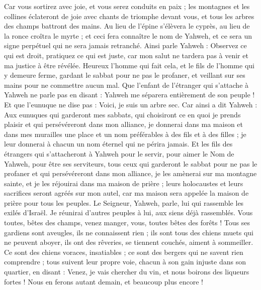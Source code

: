 \begin{multicols}{2}
Car vous sortirez avec joie, et vous serez conduits en paix ; les montagnes et les collines éclateront de joie avec chants de triomphe devant vous, et tous les arbres des champs battront des mains.
Au lieu de l'épine s'élèvera le cyprès, au lieu de la ronce croîtra le myrte ; et ceci fera connaître le nom de Yahweh, et ce sera un signe perpétuel qui ne sera jamais retranché.
\VerseOne{}Ainsi parle Yahweh : Observez ce qui est droit, pratiquez ce qui est juste, car mon salut ne tardera pas à venir et ma justice à être révélée.
Heureux l'homme qui fait cela, et le fils de l'homme qui y demeure ferme, gardant le sabbat pour ne pas le profaner, et veillant sur ses mains pour ne commettre aucun mal.
Que l'enfant de l'étranger qui s'attache à Yahweh ne parle pas en disant : Yahweh me séparera entièrement de son peuple ! Et que l'eunuque ne dise pas : Voici, je suis un arbre sec.
Car ainsi a dit Yahweh : Aux eunuques qui garderont mes sabbats, qui choisiront ce en quoi je prends plaisir et qui persévéreront dans mon alliance,
je donnerai dans ma maison et dans mes murailles une place et un nom préférables à des fils et à des filles ; je leur donnerai à chacun un nom éternel qui ne périra jamais.
Et les fils des étrangers qui s'attacheront à Yahweh pour le servir, pour aimer le Nom de Yahweh, pour être ses serviteurs, tous ceux qui garderont le sabbat pour ne pas le profaner et qui persévéreront dans mon alliance,
je les amènerai sur ma montagne sainte, et je les réjouirai dans ma maison de prière ; leurs holocaustes et leurs sacrifices seront agréés sur mon autel, car ma maison sera appelée la maison de prière pour tous les peuples.
Le Seigneur, Yahweh, parle, lui qui rassemble les exilés d'Israël. Je réunirai d'autres peuples à lui, aux siens déjà rassemblés.
Vous toutes, bêtes des champs, venez manger, vous, toutes bêtes des forêts !
Tous ses gardiens sont aveugles, ils ne connaissent rien ; ils sont tous des chiens muets qui ne peuvent aboyer, ils ont des rêveries, se tiennent couchés, aiment à sommeiller.
Ce sont des chiens voraces, insatiables ; ce sont des bergers qui ne savent rien comprendre ; tous suivent leur propre voie, chacun à son gain injuste dans son quartier, en disant :
Venez, je vais chercher du vin, et nous boirons des liqueurs fortes ! Nous en ferons autant demain, et beaucoup plus encore !

\end{multicols}
